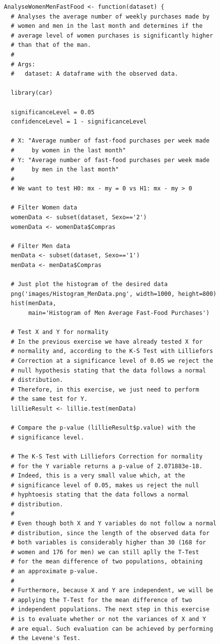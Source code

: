 \documentclass[12pt]{article}
\begin{document}
\begin{lstlisting}
AnalyseWomenMenFastFood <- function(dataset) {
  # Analyses the average number of weekly purchases made by
  # women and men in the last month and determines if the
  # average level of women purchases is significantly higher
  # than that of the man.
  #
  # Args:
  #   dataset: A dataframe with the observed data.

  library(car)

  significanceLevel = 0.05
  confidenceLevel = 1 - significanceLevel

  # X: "Average number of fast-food purchases per week made
  #     by women in the last month"
  # Y: "Average number of fast-food purchases per week made
  #     by men in the last month"
  #
  # We want to test H0: mx - my = 0 vs H1: mx - my > 0

  # Filter Women data
  womenData <- subset(dataset, Sexo=='2')
  womenData <- womenData$Compras

  # Filter Men data
  menData <- subset(dataset, Sexo=='1')
  menData <- menData$Compras

  # Just plot the histogram of the desired data
  png('images/Histogram_MenData.png', width=1000, height=800)
  hist(menData,
       main='Histogram of Men Average Fast-Food Purchases')

  # Test X and Y for normality
  # In the previous exercise we have already tested X for
  # normality and, according to the K-S Test with Lilliefors
  # Correction at a significance level of 0.05 we reject the
  # null hypothesis stating that the data follows a normal
  # distribution.
  # Therefore, in this exercise, we just need to perform
  # the same test for Y.
  lillieResult <- lillie.test(menData)

  # Compare the p-value (lillieResult$p.value) with the
  # significance level.

  # The K-S Test with Lilliefors Correction for normality
  # for the Y variable returns a p-value of 2.071883e-18.
  # Indeed, this is a very small value which, at the
  # significance level of 0.05, makes us reject the null
  # hyphtoesis stating that the data follows a normal
  # distribution.
  #
  # Even though both X and Y variables do not follow a normal
  # distribution, since the length of the observed data for
  # both variables is considerably higher than 30 (168 for
  # women and 176 for men) we can still aplly the T-Test
  # for the mean difference of two populations, obtaining
  # an approximate p-value.
  #
  # Furthermore, because X and Y are independent, we will be
  # applying the T-Test for the mean difference of two
  # independent populations. The next step in this exercise
  # is to evaluate whether or not the variances of X and Y
  # are equal. Such evaluation can be achieved by performing
  # the Levene's Test.


\end{lstlisting}
\end{document}
